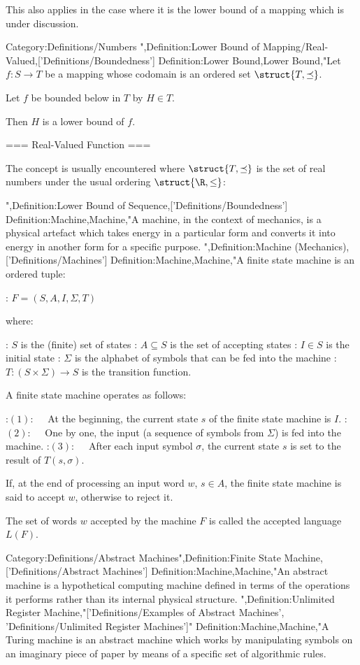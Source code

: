 This also applies in the case where it is the lower bound of a mapping which is under discussion.


Category:Definitions/Numbers
",Definition:Lower Bound of Mapping/Real-Valued,['Definitions/Boundedness']
Definition:Lower Bound,Lower Bound,"Let $f: S \to T$ be a mapping whose codomain is an ordered set $\struct {T, \preceq}$.


Let $f$ be bounded below in $T$ by $H \in T$.


Then $H$ is a lower bound of $f$.


=== Real-Valued Function ===

The concept is usually encountered where $\struct {T, \preceq}$ is the set of real numbers under the usual ordering $\struct {\R, \le}$:


",Definition:Lower Bound of Sequence,['Definitions/Boundedness']
Definition:Machine,Machine,"A machine, in the context of mechanics, is a physical artefact which takes energy in a particular form and converts it into energy in another form for a specific purpose.
",Definition:Machine (Mechanics),['Definitions/Machines']
Definition:Machine,Machine,"A finite state machine is an ordered tuple:

: $F = \left({ S, A, I, \Sigma, T }\right)$

where:

: $S$ is the (finite) set of states
: $A \subseteq S$ is the set of accepting states
: $I \in S$ is the initial state
: $\Sigma$ is the alphabet of symbols that can be fed into the machine
: $T : \left({ S \times \Sigma }\right) \rightarrow S$ is the transition function.


A finite state machine operates as follows:

:$(1): \quad$ At the beginning, the current state $s$ of the finite state machine is $I$.
:$(2): \quad$ One by one, the input (a sequence of symbols from $\Sigma$) is fed into the machine.
:$(3): \quad$ After each input symbol $\sigma$, the current state $s$ is set to the result of $T\left({s, \sigma}\right)$.


If, at the end of processing an input word $w$, $s \in A$, the finite state machine is said to accept $w$, otherwise to reject it.


The set of words $w$ accepted by the machine $F$ is called the accepted language $L\left({F}\right)$.

Category:Definitions/Abstract Machines",Definition:Finite State Machine,['Definitions/Abstract Machines']
Definition:Machine,Machine,"An abstract machine is a hypothetical computing machine defined in terms of the operations it performs rather than its internal physical structure.
",Definition:Unlimited Register Machine,"['Definitions/Examples of Abstract Machines', 'Definitions/Unlimited Register Machines']"
Definition:Machine,Machine,"A Turing machine is an abstract machine which works by manipulating symbols on an imaginary piece of paper by means of a specific set of algorithmic rules.

